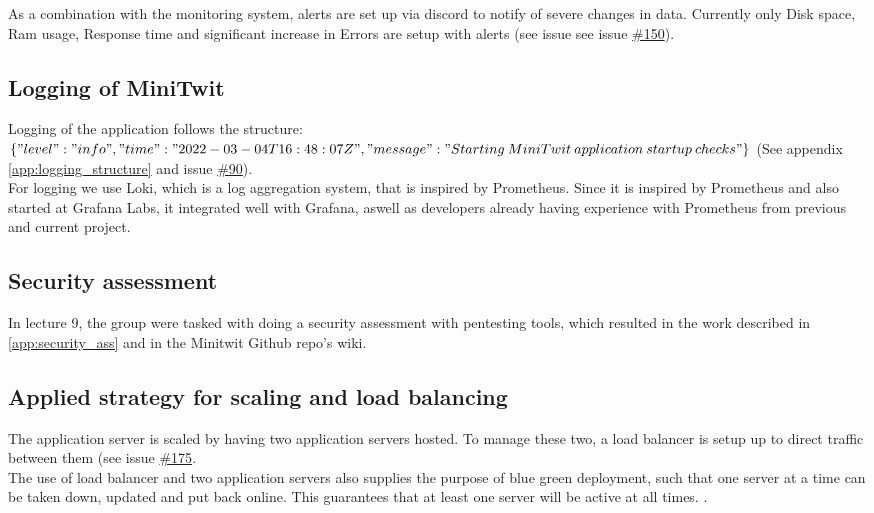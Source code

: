 As a combination with the monitoring system, alerts are set up via discord to notify of severe changes in data. Currently only Disk space, Ram usage, Response time and significant increase in Errors are setup with alerts (see issue see issue \href{https://github.com/DevelOpsITU/MiniTwit/issues/150}{\#150}).


\subsection{Logging of MiniTwit}
Logging of the application follows the structure: \\
$\{"level":"info","time":"2022-03-04T16:48:07Z",\\"message":"Starting\: MiniTwit\: application\: startup\: checks"\}$ (See appendix \ref{app:logging_structure} and issue \href{https://github.com/DevelOpsITU/MiniTwit/issues/90}{\#90}).\\

For logging we use Loki, which is a log aggregation system, that is inspired by Prometheus\cite{grafana_loki}\cite{grafana_loki_docs}. Since it is inspired by Prometheus and also started at Grafana Labs, it integrated well with Grafana, aswell as developers already having experience with Prometheus from previous and current project. 

\subsection{Security assessment}
In lecture 9, the group were tasked with doing a security assessment with pentesting tools, which resulted in the work described in \autoref{app:security_ass} and in the Minitwit Github repo's wiki.\cite{}  


\subsection{Applied strategy for scaling and load balancing}
The application server is scaled by having two application servers hosted. To manage these two, a load balancer is setup up to direct traffic between them (see issue \href{https://github.com/DevelOpsITU/MiniTwit/issues/175}{\#175}. \\
The use of load balancer and two application servers also supplies the purpose of blue green deployment, such that one server at a time can be taken down, updated and put back online. This guarantees that at least one server will be active at all times.  \cite{blue_green_deployment}.

